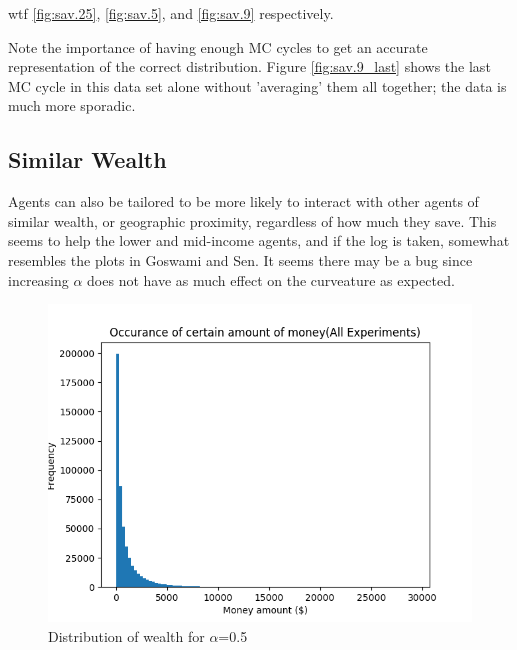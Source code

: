 \documentclass[12pt]{article} %
\begin{document}
wtf \ref{fig:sav.25}, \ref{fig:sav.5}, and \ref{fig:sav.9} respectively.

Note the importance of having enough MC cycles to get an accurate
representation of the correct distribution. Figure \ref{fig:sav.9_last} shows
the last MC cycle in this data set alone without 'averaging' them all together;
the data is much more sporadic.


\subsection{Similar Wealth}
Agents can also be tailored to be more likely to interact with other agents of
similar wealth, or geographic proximity, regardless of how much they save. This seems to help the lower and
mid-income agents, and if the log is taken, somewhat resembles the plots in
Goswami and Sen\cite{Goswami}. It seems there may be a bug since increasing
$\alpha$ does not have as much effect on the curveature as expected.


\newcommand{\scaleResultsC}{0.7}
\begin{figure}
	\includegraphics[scale=\scaleResultsC]{a.5.png}
	\centering
	\caption{Distribution of wealth for $\alpha$=0.5}
	\label{fig:a.5}
\end{figure}
\end{document}
